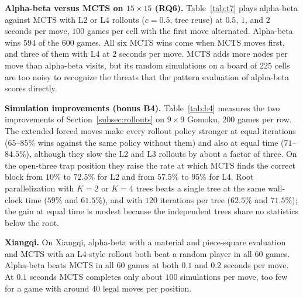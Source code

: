 \begin{table}[t]
\centering
\caption{T6: Rollouts per second, and win rate (\%) of MCTS with each rollout policy against MCTS with L0 on $9\times 9$ Gomoku at equal iterations or equal time, $200$ games per cell}
\label{tab:t6}
\resizebox{\columnwidth}{!}{}
\end{table}

\textbf{Alpha-beta versus MCTS on $15\times 15$ (RQ6).} Table~\ref{tab:t7} plays alpha-beta against MCTS with L2 or L4 rollouts ($c = 0.5$, tree reuse) at $0.5$, $1$, and $2$ seconds per move, $100$ games per cell with the first move alternated. Alpha-beta wins $594$ of the $600$ games. All six MCTS wins come when MCTS moves first, and three of them with L4 at $2$ seconds per move. MCTS adds more nodes per move than alpha-beta visits, but its random simulations on a board of $225$ cells are too noisy to recognize the threats that the pattern evaluation of alpha-beta scores directly.

\begin{table}[t]
\centering
\caption{T7: Alpha-beta (AB) against MCTS on $15\times 15$ Gomoku at equal time per move; AB wins out of $50$ games when each side moves first, and nodes per move}
\label{tab:t7}
\resizebox{\columnwidth}{!}{}
\end{table}

\textbf{Simulation improvements (bonus B4).} Table~\ref{tab:b4} measures the two improvements of Section~\ref{subsec:rollouts} on $9\times 9$ Gomoku, $200$ games per row. The extended forced moves make every rollout policy stronger at equal iterations ($65$--$85\%$ wins against the same policy without them) and also at equal time ($71$--$84.5\%$), although they slow the L2 and L3 rollouts by about a factor of three. On the open-three trap position they raise the rate at which MCTS finds the correct block from $10\%$ to $72.5\%$ for L2 and from $57.5\%$ to $95\%$ for L4. Root parallelization with $K=2$ or $K=4$ trees beats a single tree at the same wall-clock time ($59\%$ and $61.5\%$), and with $120$ iterations per tree ($62.5\%$ and $71.5\%$); the gain at equal time is modest because the independent trees share no statistics below the root.

\begin{table}[t]
\centering
\caption{B4: Win rate of MCTS with the extended forced moves (L$x$-B4) against the same policy without them, and of root parallelization with $K$ trees against one tree, on $9\times 9$ Gomoku}
\label{tab:b4}
\resizebox{\columnwidth}{!}{}
\end{table}

\textbf{Xiangqi.} On Xiangqi, alpha-beta with a material and piece-square evaluation and MCTS with an L4-style rollout both beat a random player in all $60$ games. Alpha-beta beats MCTS in all $60$ games at both $0.1$ and $0.2$ seconds per move. At $0.1$ seconds MCTS completes only about $100$ simulations per move, too few for a game with around $40$ legal moves per position.
